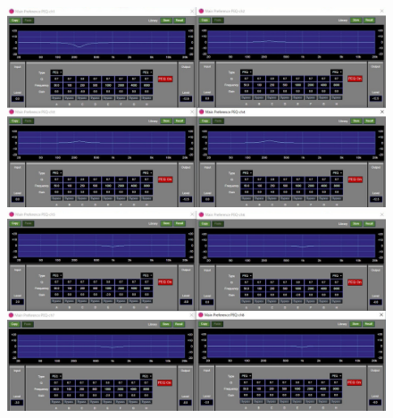 \documentclass[11pt,a4j]{jreport}
\begin{document}
\newpage
{}
\begin{figure}[H]
  \begin{minipage}[b]{.5\linewidth}
    \centering
    \includegraphics[width=.9\linewidth]{images/experimentField/afcParameters/04delta/05manualEQ6.jpg}
  \end{minipage}%
  \begin{minipage}[b]{.5\linewidth}
    \centering
    \includegraphics[width=.9\linewidth]{images/experimentField/afcParameters/04delta/05manualEQ7.jpg}
  \end{minipage}


\end{figure}
\end{document}
